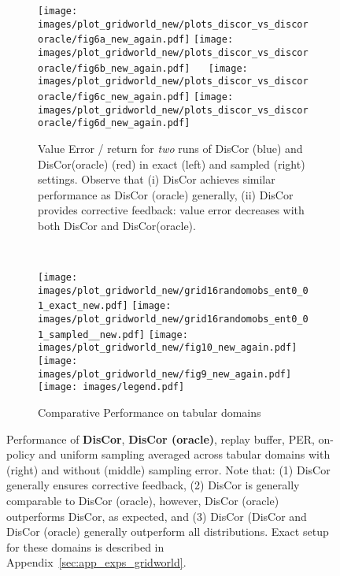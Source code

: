 \documentclass[jmlr]{article}
\begin{document}
\begin{figure}
    \centering
    \begin{subfigure}[t]{.99\linewidth}
        \centering
        \texttt{[image: images/plot\_gridworld\_new/plots\_discor\_vs\_discororacle/fig6a\_new\_again.pdf]}
        \texttt{[image: images/plot\_gridworld\_new/plots\_discor\_vs\_discororacle/fig6b\_new\_again.pdf]}
        ~\vline~
        \texttt{[image: images/plot\_gridworld\_new/plots\_discor\_vs\_discororacle/fig6c\_new\_again.pdf]}
        \texttt{[image: images/plot\_gridworld\_new/plots\_discor\_vs\_discororacle/fig6d\_new\_again.pdf]}
        \caption{\footnotesize{Value Error / return for \textit{two} runs of DisCor (blue) and DisCor(oracle) (red) in exact (left) and sampled (right) settings. Observe that (i) DisCor achieves similar performance as DisCor (oracle) generally, (ii) DisCor provides corrective feedback: value error decreases with both DisCor and DisCor(oracle).}}
    \end{subfigure}
    ~
    \begin{subfigure}[t]{.95\linewidth}
        \centering
        \texttt{[image: images/plot\_gridworld\_new/grid16randomobs\_ent0\_01\_exact\_new.pdf]}
        \texttt{[image: images/plot\_gridworld\_new/grid16randomobs\_ent0\_01\_sampled\_\_new.pdf]}
        \texttt{[image: images/plot\_gridworld\_new/fig10\_new\_again.pdf]}
        \texttt{[image: images/plot\_gridworld\_new/fig9\_new\_again.pdf]}
        \texttt{[image: images/legend.pdf]}
        \caption{\footnotesize{Comparative Performance on tabular domains}}
    \end{subfigure}
    \caption{\footnotesize{Performance of \textbf{DisCor}, \textbf{DisCor (oracle)}, replay buffer, PER, on-policy and uniform sampling averaged across tabular domains with (right) and without (middle) sampling error. Note that: (1) DisCor generally ensures corrective feedback, (2) DisCor is generally comparable to DisCor (oracle), however, DisCor (oracle) outperforms DisCor, as expected, and (3) DisCor (DisCor and DisCor (oracle) generally outperform all distributions. Exact setup for these domains is described in Appendix~\ref{sec:app_exps_gridworld}.}}
    \label{fig:gridworls_samling}
    \vspace{-0.5cm}
\end{figure}
\end{document}
